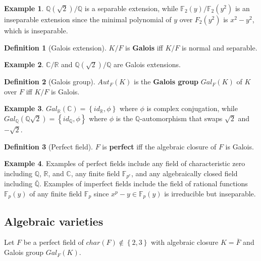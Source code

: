 \documentclass{article}
\newcommand{\F}{\mathbb{F}}
\newcommand{\Q}{\mathbb{Q}}
\newcommand{\R}{\mathbb{R}}
\newcommand{\C}{\mathbb{C}}
\newcommand{\rb}[1]{\left( #1 \right)}
\newcommand{\cb}[1]{\left\{ #1 \right\}}
\theoremstyle{definition}\newtheorem*{definition}{Definition}
\theoremstyle{definition}\newtheorem*{example}{Example}
\theoremstyle{definition}\newtheorem*{remark}{Remark}
\begin{document}
\begin{example}
$ \Q\rb{\sqrt{2}} / \Q $ is a separable extension, while $ \F_2\rb{y} / \F_2\rb{y^2} $ is an inseparable extension since the minimal polynomial of $ y $ over $ F_2\rb{y^2} $ is $ x^2 - y^2 $, which is inseparable.
\end{example}

\begin{definition}[Galois extension]
$ K / F $ is \textbf{Galois} iff $ K / F $ is normal and separable.
\end{definition}

\begin{example}
$ \C / \R $ and $ \Q\rb{\sqrt{2}} / \Q $ are Galois extensions.
\end{example}

\begin{definition}[Galois group]
$ Aut_F\rb{K} $ is the \textbf{Galois group} $ Gal_F\rb{K} $ of $ K $ over $ F $ iff $ K / F $ is Galois.
\end{definition}

\begin{example}
$ Gal_\R\rb{\C} = \cb{id_\R, \phi} $ where $ \phi $ is complex conjugation, while $ Gal_\Q\rb{\Q\sqrt{2}} = \cb{id_\Q, \phi} $ where $ \phi $ is the $ \Q $-automorphism that swaps $ \sqrt{2} $ and $ -\sqrt{2} $.
\end{example}

\begin{definition}[Perfect field]
$ F $ is \textbf{perfect} iff the algebraic closure of $ F $ is Galois.
\end{definition}

\begin{example}
Examples of perfect fields include any field of characteristic zero including $ \Q $, $ \R $, and $ \C $, any finite field $ \F_{p^e} $, and any algebraically closed field including $ \bar{\Q} $. Examples of imperfect fields include the field of rational functions $ \F_p\rb{y} $ of any finite field $ \F_p $ since $ x^p - y \in \F_p\rb{y} $ is irreducible but inseparable.
\end{example}

\pagebreak

\subsection{Algebraic varieties}

Let $ F $ be a perfect field of $ char\rb{F} \notin \cb{2, 3} $ with algebraic closure $ K = \bar{F} $ and Galois group $ Gal_F\rb{K} $.
\end{document}
